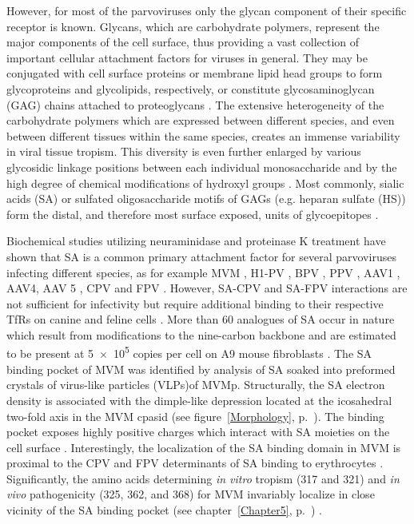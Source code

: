 However, for most of the parvoviruses only the glycan component of their specific receptor is known. Glycans, which are carbohydrate polymers, represent the major components of the cell surface, thus providing a vast collection of important cellular attachment factors for viruses in general. They may be conjugated with cell surface proteins or membrane lipid head groups to form glycoproteins and glycolipids, respectively, or constitute glycosaminoglycan (GAG) chains attached to proteoglycans \cite{pmid16019714}. The extensive heterogeneity of the carbohydrate polymers which are expressed between different species, and even between different tissues within the same species, creates an immense variability in viral tissue tropism. This diversity is even further enlarged by various glycosidic linkage positions between each individual monosaccharide and by the high degree of chemical modifications of hydroxyl groups \cite{pmid11841250, pmid17632542}. Most commonly, sialic acids (SA) or sulfated oligosaccharide motifs of GAGs (e.g. heparan sulfate (HS)) form the distal, and therefore most surface exposed, units of glycoepitopes \cite{pmid17072005}.


Biochemical studies utilizing neuraminidase and proteinase K treatment have shown that SA is a common primary attachment factor for several parvoviruses infecting different species, as for example MVM \cite{pmid3296697, pmid16415031}, H1-PV \cite{pmid22258256}, BPV \cite{pmid15750863, pmid9747725, pmid15269359}, PPV \cite{pmid20484503}, AAV1 \cite{pmid16943302, pmid16940521}, AAV4, AAV 5 \cite{pmid15761263, pmid11435568, pmid11262413, pmid16409121}, CPV and FPV \cite{pmid1329321, pmid7975239}. However, SA-CPV and SA-FPV interactions are not sufficient for infectivity but require additional binding to their respective TfRs on canine and feline cells \cite{pmid1329321, pmid12525605, pmid11264378, pmid12885908}. More than 60 analogues of SA occur in nature which result from modifications to the nine-carbon backbone \cite{pmid17072005} and are estimated to be present at 5~$\times$~10\textsuperscript{5} copies per cell on A9 mouse fibroblasts \cite{pmid20517, pmid6602221}. The SA binding pocket of MVM was identified by analysis of SA soaked into preformed crystals of virus-like particles (VLPs)\footnotemark of MVMp. Structurally, the SA electron density is associated with the dimple-like depression located at the icosahedral two-fold axis in the MVM cpasid (see figure~\ref{Morphology}, p.~\pageref{Morphology}). The binding pocket exposes highly positive charges which interact with SA moieties on the cell surface \cite{pmid16415031}. Interestingly, the localization of the SA binding domain in MVM is proximal to the CPV and FPV determinants of SA binding to erythrocytes \cite{pmid7645206, pmid8392729, pmid1329321, pmid10884355}. Significantly, the amino acids determining \textit{in vitro} tropism (317 and 321) and \textit{in vivo} pathogenicity (325, 362, and 368) for MVM invariably localize in close vicinity of the SA binding pocket (see chapter~\ref{Chapter5}, p.~\pageref{Chapter5}) \cite{pmid16103145}.                  

